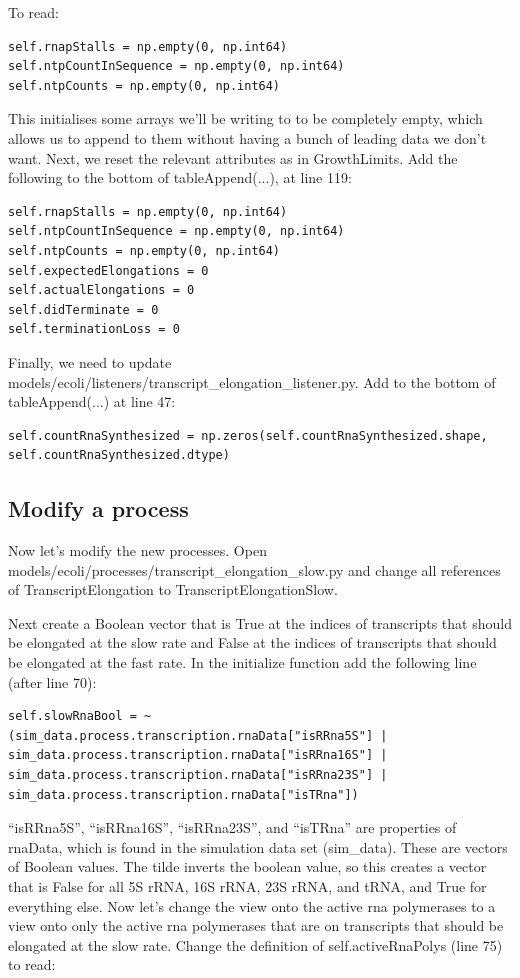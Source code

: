 \documentclass[12pt]{article}
\begin{document}
To read:
\lstset{language=Python}
\begin{lstlisting}
self.rnapStalls = np.empty(0, np.int64)
self.ntpCountInSequence = np.empty(0, np.int64)
self.ntpCounts = np.empty(0, np.int64)
\end{lstlisting}

This initialises some arrays we'll be writing to to be completely empty, which allows us to append to them without having a bunch of leading data we don't want. Next, we reset the relevant attributes as in GrowthLimits. Add the following to the bottom of tableAppend(...), at line 119:
\lstset{language=Python}
\begin{lstlisting}
self.rnapStalls = np.empty(0, np.int64)
self.ntpCountInSequence = np.empty(0, np.int64)
self.ntpCounts = np.empty(0, np.int64)
self.expectedElongations = 0
self.actualElongations = 0
self.didTerminate = 0
self.terminationLoss = 0
\end{lstlisting}

Finally, we need to update models/ecoli/listeners/transcript_elongation_listener.py. Add to the bottom of tableAppend(...) at line 47:
\lstset{language=Python}
\begin{lstlisting}
self.countRnaSynthesized = np.zeros(self.countRnaSynthesized.shape, self.countRnaSynthesized.dtype)
\end{lstlisting}

\subsection{Modify a process}

Now let’s modify the new processes. Open models/ecoli/processes/transcript\_elongation\_slow.py and change all references of TranscriptElongation to TranscriptElongationSlow.

Next create a Boolean vector that is True at the indices of transcripts that should be elongated at the slow rate and False at the indices of transcripts that should be elongated at the fast rate. In the initialize function add the following line (after line 70):

\lstset{language=Python}
\begin{lstlisting}
self.slowRnaBool = ~(sim_data.process.transcription.rnaData["isRRna5S"] | sim_data.process.transcription.rnaData["isRRna16S"] | sim_data.process.transcription.rnaData["isRRna23S"] | sim_data.process.transcription.rnaData["isTRna"])
\end{lstlisting}

“isRRna5S”, “isRRna16S”, “isRRna23S”, and “isTRna” are properties of rnaData, which is found in the simulation data set (sim_data). These are vectors of Boolean values. The tilde inverts the boolean value, so this creates a vector that is False for all 5S rRNA, 16S rRNA, 23S rRNA, and tRNA, and True for everything else.
Now let’s change the view onto the active rna polymerases to a view onto only the active rna polymerases that are on transcripts that should be elongated at the slow rate. Change the definition of self.activeRnaPolys (line 75) to read:
\end{document}
